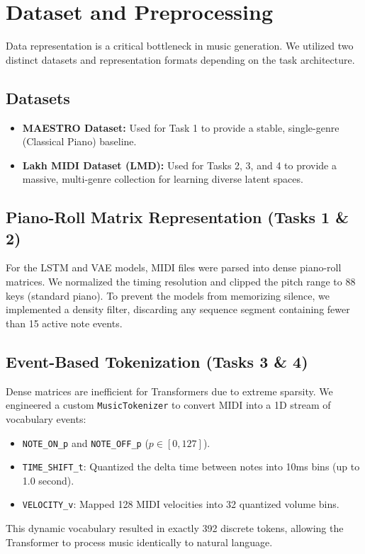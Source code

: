 \documentclass[conference]{IEEEtran}
\begin{document}
\section{Dataset and Preprocessing}
Data representation is a critical bottleneck in music generation. We utilized two distinct datasets and representation formats depending on the task architecture.

\subsection{Datasets}
\begin{itemize}
    \item \textbf{MAESTRO Dataset:} Used for Task 1 to provide a stable, single-genre (Classical Piano) baseline.
    \item \textbf{Lakh MIDI Dataset (LMD):} Used for Tasks 2, 3, and 4 to provide a massive, multi-genre collection for learning diverse latent spaces.
\end{itemize}

\subsection{Piano-Roll Matrix Representation (Tasks 1 \& 2)}
For the LSTM and VAE models, MIDI files were parsed into dense piano-roll matrices. We normalized the timing resolution and clipped the pitch range to 88 keys (standard piano). To prevent the models from memorizing silence, we implemented a density filter, discarding any sequence segment containing fewer than 15 active note events.

\subsection{Event-Based Tokenization (Tasks 3 \& 4)}
Dense matrices are inefficient for Transformers due to extreme sparsity. We engineered a custom \texttt{MusicTokenizer} to convert MIDI into a 1D stream of vocabulary events:
\begin{itemize}
    \item \texttt{NOTE\_ON\_p} and \texttt{NOTE\_OFF\_p} ($p \in [0, 127]$).
    \item \texttt{TIME\_SHIFT\_t}: Quantized the delta time between notes into 10ms bins (up to 1.0 second).
    \item \texttt{VELOCITY\_v}: Mapped 128 MIDI velocities into 32 quantized volume bins.
\end{itemize}
This dynamic vocabulary resulted in exactly 392 discrete tokens, allowing the Transformer to process music identically to natural language.
\end{document}
